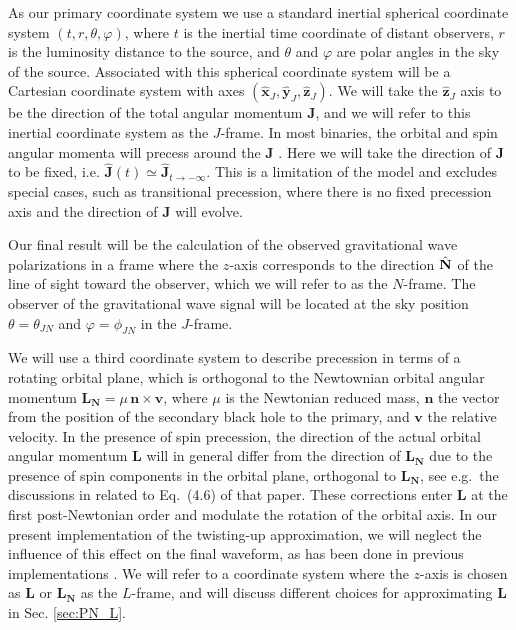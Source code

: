 \documentclass[%
aps,
prd,
amssymb,
amsmath,
amsfonts,
eqsecnum,
showpacs,
nofootinbib,
floatfix,
twocolumn,
twoside,
a4paper,
superscriptaddress
]{revtex4-1}
\newcommand{\x}{\mathbf{\hat{x}}}
\newcommand{\y}{\mathbf{\hat{y}}}
\newcommand{\z}{\mathbf{\hat{z}}}
\newcommand{\hN}{{\hat{\bf{N}}}}
\newcommand{\J}{\mathbf{J}}
\begin{document}
As our primary coordinate system we use a standard inertial spherical coordinate system $(t, r,\theta,\varphi)$, where $t$ is the inertial time coordinate of distant observers, $r$ is the luminosity distance to the source, and $\theta$ and $\varphi$ are polar angles in the sky of the source.
Associated with this spherical coordinate system will be a Cartesian coordinate system with axes $(\x_J , \y_J , \z_J)$. We will take the $\z_J$ axis to be the direction of the total angular momentum $\J$, and we will refer to this inertial coordinate system as the $J$-frame. In most binaries, the orbital and spin angular momenta will precess around the $\J$ \cite{Apostolatos:1994mx,Kidder:1995zr}. Here we will take the direction of $\J$ to be fixed, i.e. $\hat{\J} (t) \simeq \hat{\J}_{t \rightarrow - \infty}$. This is a limitation of the model and excludes special cases, such as transitional precession, where there is no fixed precession axis and the direction of $\J$ will evolve. 

Our final result will be the calculation of the observed gravitational wave polarizations in a frame where the $z$-axis corresponds to the direction $\hN$ of the line of sight toward the observer, which we will refer to as the $N$-frame. The observer of the gravitational wave signal will be located at the sky position $\theta = \theta_{JN}$ and $\varphi = \phi_{JN}$ in the $J$-frame.

We will use a third coordinate system to describe precession in terms of a rotating orbital plane, which is orthogonal to the Newtownian orbital angular momentum
$ \mathbf{L_N} =  \mu \, \mathbf{n} \times  \mathbf{v}$,
where $\mu$ is the Newtonian reduced mass, $\mathbf{n}$ the vector from the position of the secondary black hole to the primary, and $\mathbf{v}$ the relative velocity. In the presence of spin precession, the direction of the actual orbital angular momentum $\mathbf{L}$ will in general differ from the direction of 
$\mathbf{L_N}$ due to the presence of spin components in the orbital plane, orthogonal to $\mathbf{L_N}$, see e.g.~the discussions in \cite{Schmidt:2010it} related to Eq.~(4.6) of that paper. These corrections enter $\mathbf{L}$ at the first post-Newtonian order and modulate the rotation of the orbital axis. In our present implementation of the twisting-up approximation, we will neglect the influence of this effect on the final waveform, as has been done in previous implementations \cite{Hannam:2013oca,Bohe:PPv2,Khan:2018fmp,Khan:2019kot}.
%
We will refer to a coordinate system where the $z$-axis is chosen as 
$\mathbf{L}$ or $\mathbf{L_N}$ as the $L$-frame, and will discuss different choices for approximating $\mathbf{L}$ in Sec. \ref{sec:PN_L}.
\end{document}
